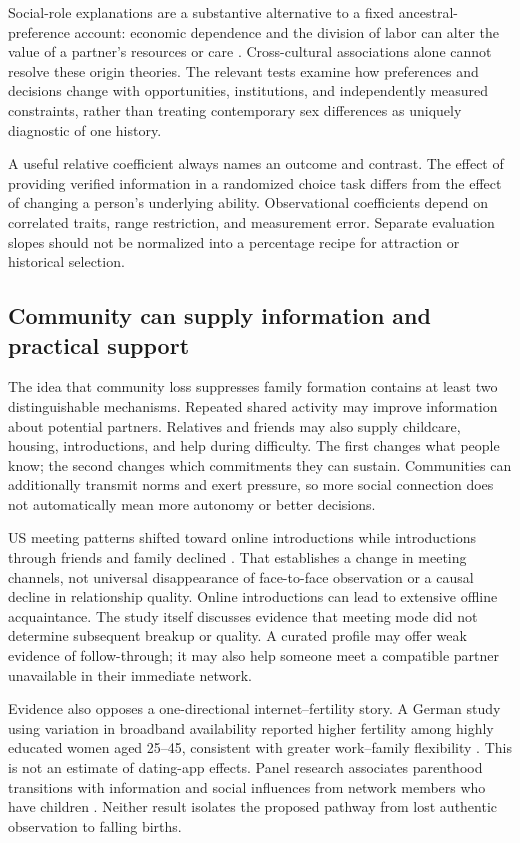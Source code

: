 \documentclass[10pt,twocolumn,letterpaper]{article}
\begin{document}
Social-role explanations are a substantive alternative to a fixed ancestral-preference account: economic dependence and the division of labor can alter the value of a partner's resources or care \citep{eagly1999}. Cross-cultural associations alone cannot resolve these origin theories. The relevant tests examine how preferences and decisions change with opportunities, institutions, and independently measured constraints, rather than treating contemporary sex differences as uniquely diagnostic of one history.

A useful relative coefficient always names an outcome and contrast. The effect of providing verified information in a randomized choice task differs from the effect of changing a person's underlying ability. Observational coefficients depend on correlated traits, range restriction, and measurement error. Separate evaluation slopes should not be normalized into a percentage recipe for attraction or historical selection.

\subsection{Community can supply information and practical support}
\label{sec:community}
The idea that community loss suppresses family formation contains at least two distinguishable mechanisms. Repeated shared activity may improve information about potential partners. Relatives and friends may also supply childcare, housing, introductions, and help during difficulty. The first changes what people know; the second changes which commitments they can sustain. Communities can additionally transmit norms and exert pressure, so more social connection does not automatically mean more autonomy or better decisions.

US meeting patterns shifted toward online introductions while introductions through friends and family declined \citep{rosenfeld2019}. That establishes a change in meeting channels, not universal disappearance of face-to-face observation or a causal decline in relationship quality. Online introductions can lead to extensive offline acquaintance. The study itself discusses evidence that meeting mode did not determine subsequent breakup or quality. A curated profile may offer weak evidence of follow-through; it may also help someone meet a compatible partner unavailable in their immediate network.

Evidence also opposes a one-directional internet--fertility story. A German study using variation in broadband availability reported higher fertility among highly educated women aged 25--45, consistent with greater work--family flexibility \citep{billari2019}. This is not an estimate of dating-app effects. Panel research associates parenthood transitions with information and social influences from network members who have children \citep{lois2014}. Neither result isolates the proposed pathway from lost authentic observation to falling births.
\end{document}
